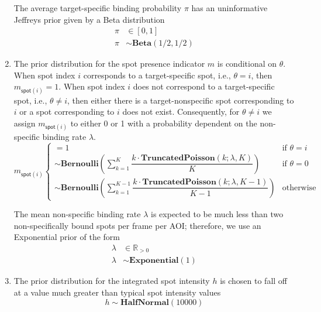 \begin{enumerate}
\noindent
The average target-specific binding probability $\pi$ has an uninformative Jeffreys prior given by a Beta distribution
%
\begin{subequations}
\begin{align}
    \pi &\in [0, 1] \\
    \pi &\sim \mathbf{Beta}(1/2, 1/2)
\end{align}
\end{subequations}

\item The prior distribution for the spot presence indicator $m$ is conditional on $\theta$. When spot index $i$ corresponds to a target-specific spot, i.e., $\theta = i$, then $m_{\mathsf{spot}(i)} = 1$. When spot index $i$ does not correspond to a target-specific spot, i.e., $\theta \neq i$, then either there is a target-nonspecific spot corresponding to $i$ or a spot corresponding to $i$ does not exist. Consequently, for $\theta \neq i$ we assign $m_{\mathsf{spot}(i)}$ to either 0 or 1 with a probability dependent on the non-specific binding rate $\lambda$.
%
\begin{equation}
    m_{\mathsf{spot}(i)}
    \begin{cases}
         = 1 & \text{if $\theta = i$} \\
        \sim \mathbf{Bernoulli} \left( \sum_{k=1}^K \dfrac{k \cdot \mathbf{TruncatedPoisson}(k; \lambda, K)}{K} \right) & \text{if $\theta = 0$} \\
        \sim \mathbf{Bernoulli} \left( \sum_{k=1}^{K-1} \dfrac{k \cdot \mathbf{TruncatedPoisson}(k; \lambda, K-1)}{K-1} \right) & \text{otherwise}
    \end{cases}
\end{equation}

\noindent
The mean non-specific binding rate $\lambda$ is expected to be much less than two non-specifically bound spots per frame per AOI; therefore, we use an Exponential prior of the form
%
\begin{subequations}
\begin{align}
    \lambda &\in \mathbb{R}_{>0} \\
    \lambda &\sim \mathbf{Exponential}(1)
\end{align}
\end{subequations}

\item The prior distribution for the integrated spot intensity $h$ is chosen to fall off at a value much greater than typical spot intensity values 
%
\begin{equation}
    h \sim \mathbf{HalfNormal}(10000)
\end{equation}


\end{enumerate}
